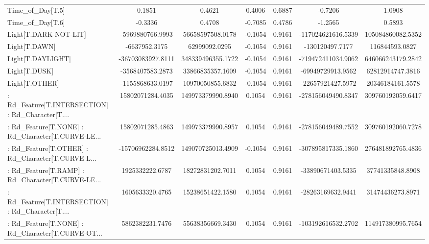 \begin{longtable}{p{4cm}cccccc}
Time\_of\_Day[T.5]                                   &            0.1851 &            0.4621 &  0.4006 &       0.6887 &            -0.7206 &            1.0908 \\
Time\_of\_Day[T.6]                                   &           -0.3336 &            0.4708 & -0.7085 &       0.4786 &            -1.2565 &            0.5893 \\
Light[T.DARK-NOT-LIT]                              &  -5969880766.9993 &  56658597508.0178 & -0.1054 &       0.9161 & -117024621616.5339 & 105084860082.5352 \\
Light[T.DAWN]                                      &     -6637952.3175 &     62999092.0295 & -0.1054 &       0.9161 &    -130120497.7177 &    116844593.0827 \\
Light[T.DAYLIGHT]                                  & -36703083927.8111 & 348339496355.1722 & -0.1054 &       0.9161 & -719472411034.9062 & 646066243179.2842 \\
Light[T.DUSK]                                      &  -3568407583.2873 &  33866835357.1609 & -0.1054 &       0.9161 &  -69949729913.9562 &  62812914747.3816 \\
Light[T.OTHER]                                     &  -1155868633.0197 &  10970050855.6832 & -0.1054 &       0.9161 &  -22657921427.5972 &  20346184161.5578 \\
 : Rd\_Feature[T.INTERSECTION] : Rd\_Character[T.... &  15802071284.4035 & 149973379990.8940 &  0.1054 &       0.9161 & -278156049490.8347 & 309760192059.6417 \\
 : Rd\_Feature[T.NONE] : Rd\_Character[T.CURVE-LE... &  15802071285.4863 & 149973379990.8957 &  0.1054 &       0.9161 & -278156049489.7552 & 309760192060.7278 \\
 : Rd\_Feature[T.OTHER] : Rd\_Character[T.CURVE-L... & -15706962284.8512 & 149070725013.4909 & -0.1054 &       0.9161 & -307895817335.1860 & 276481892765.4836 \\
 : Rd\_Feature[T.RAMP] : Rd\_Character[T.CURVE-LE... &   1925332222.6787 &  18272831202.7011 &  0.1054 &       0.9161 &  -33890671403.5335 &  37741335848.8908 \\
 : Rd\_Feature[T.INTERSECTION] : Rd\_Character[T.... &   1605633320.4765 &  15238651422.1580 &  0.1054 &       0.9161 &  -28263169632.9441 &  31474436273.8971 \\
 : Rd\_Feature[T.NONE] : Rd\_Character[T.CURVE-OT... &   5862382231.7476 &  55638356669.3430 &  0.1054 &       0.9161 & -103192616532.2702 & 114917380995.7654 \\

\end{longtable}

